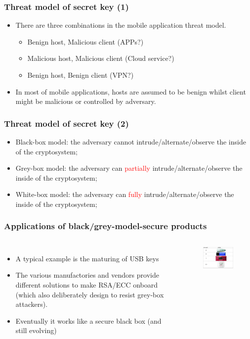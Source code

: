 \documentclass{beamer}
\begin{document}
\frame
{
\frametitle{Threat model of secret key (1)}
\begin{itemize}
 \setlength{\itemsep}{12pt}
\item There are three combinations in the mobile application threat model.
\begin{itemize}
\setlength{\itemsep}{12pt}
\item Benign host, Malicious client (APPs?)
\item Malicious host, Malicious client (Cloud service?)
\item Benign host, Benign client (VPN?)
\end{itemize}
\setlength{\itemsep}{12pt}
\item In most of mobile applications, hosts are assumed to be benign whilst client might be malicious or controlled by adversary.
\end{itemize}
}

\frame
{
\frametitle{Threat model of secret key (2)}

\begin{itemize}
 \setlength{\itemsep}{12pt}
 \item Black-box model: the adversary cannot intrude/alternate/observe the inside of the cryptosystem;

 \item Grey-box model: the adversary can \textcolor{red}{partially} intrude/alternate/observe the inside of the cryptosystem;

 \item White-box model: the adversary can \textcolor{red}{fully} intrude/alternate/observe the inside of the cryptosystem;
\end{itemize}
}

\frame
{
\frametitle{Applications of black/grey-model-secure products}
\begin{columns}[c]
\begin{itemize}
\item A typical example is the maturing of USB keys
\item The various manufactories and vendors provide different solutions to make RSA/ECC onboard (which also deliberately design to resist grey-box attackers).
\item Eventually it works like a secure black box (and still evolving)
\end{itemize}
\begin{figure}[htbp]
\centering
  \includegraphics[width=4.8cm]{./pics/usbkey.png}
\end{figure}

\end{columns}

}
\end{document}
